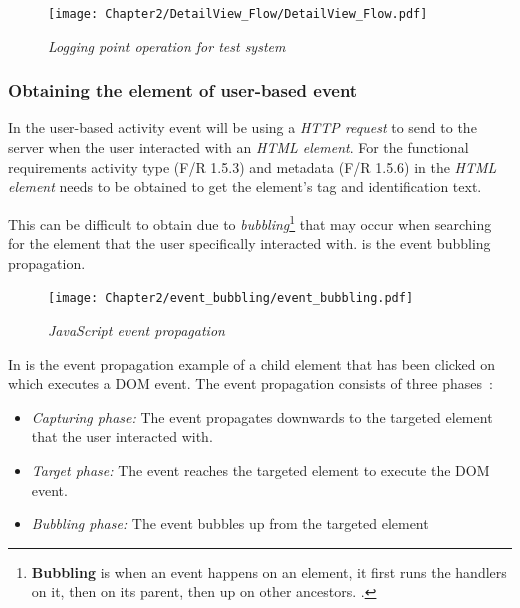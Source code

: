 \clearpage

\begin{figure}[!htb]
	\centering %
	\texttt{[image: Chapter2/DetailView\_Flow/DetailView\_Flow.pdf]}
	\caption[Logging point operation for test system]
	{\textit{Logging point operation for test system}}\label{fig:ch3_loggingProcess}
\end{figure}

\clearpage

\subsubsection{Obtaining the element of user-based event}\label{sec:ch3_ElementObtaining}
In  the user-based activity event will be using a \textit{HTTP request} to send to the server when the user interacted with an \textit{HTML element}. For the functional requirements activity type (F/R 1.5.3) and metadata (F/R 1.5.6) in  the \textit{HTML element} needs to be obtained to get the element's tag and identification text.\par This can be difficult to obtain due to \textit{bubbling}\footnote{\textbf{Bubbling} is when an event happens on an element, it first runs the handlers on it, then on its parent, then up on other ancestors. \cite{EventBubbling}.} that may occur when searching for the element that the user specifically interacted with.  is the event bubbling propagation.

\begin{figure}[!htb]
	\centering %
	\texttt{[image: Chapter2/event\_bubbling/event\_bubbling.pdf]}
	\caption[JavaScript event propagation]
	{\textit{JavaScript event propagation~\cite{EventBubbling}}}\label{fig:ch2_event_bubbling}
\end{figure}

In  is the event propagation example of a child element that has been clicked on which executes a DOM event. The event propagation consists of three phases~\cite{EventBubbling}:

\begin{itemize}
	\item \textit{Capturing phase:} The event propagates downwards to the targeted element that the user interacted with.
	\item \textit{Target phase:} The event reaches the targeted element to execute the DOM event.
	\item \textit{Bubbling phase:} The event bubbles up from the targeted element
\end{itemize}

